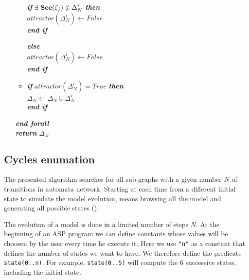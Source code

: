 \begin{algorithm}[!h]
\begin{itemize}
\begin{itemize}
							\hspace{1.2cm} \textbf{\textit{if}} $\exists$ $\mathbf{Sce}(\zeta_j) \notin  \Delta_N^i$ \textbf{\textit{then}} \\ \hspace{1.7cm} $attractor(\Delta_N^i) \longleftarrow False$ \\
							\hspace{1.2cm} \textbf{\textit{end if}} 
							
							\textbf{\textit{else}} \\
							\hspace{0.7cm} $attractor(\Delta_N^i) \longleftarrow False$ \\
							\textbf{\textit{end if}} 
					\item[] \textbf{\textit{if}} $attractor(\Delta_N^i) = True$ \textbf{\textit{then}}\\
					\hspace{0.5cm}  $\Delta_N \longleftarrow \Delta_N \cup \Delta_N^i$ \\
					\textbf{\textit{end if}} 

				\end{itemize}		
			\hspace{0.2cm} \textbf{\textit{end forall}} \\		
			\hspace{0.2cm} \textbf{\textit{return}} $\Delta_N$		
	\end{itemize}
\end{algorithm}

\subsection{Cycles enumation}
The presented algorithm searches for all sub-graphs with a given number $N$ of transitions %
in automata network. Starting at each time from a different initial state to simulate the model evolution, means browsing all the model and generating all possible states (). 

The evolution of a model is done in a limited number of steps $N$. At the beginning of an ASP program we can define constants whose values will be choosen by the user every time he execute it. Here we use \texttt{"n"} as a constant that defines the number of states we want to have.
We therefore define the predicate \texttt{state(0..n)}.
For example, \texttt{state(0..5)} will compute the 6 successive states, including the initial state.

